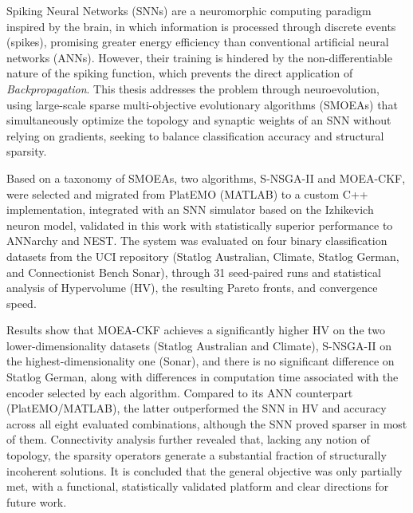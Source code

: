 \documentclass[dosguias,openany]{tesisusach}
\begin{document}
	\begin{resumenEn}
		Spiking Neural Networks (SNNs) are a neuromorphic computing paradigm inspired by the brain, in which information is processed through discrete events (spikes), promising greater energy efficiency than conventional artificial neural networks (ANNs). However, their training is hindered by the non-differentiable nature of the spiking function, which prevents the direct application of \textit{Backpropagation}. This thesis addresses the problem through neuroevolution, using large-scale sparse multi-objective evolutionary algorithms (SMOEAs) that simultaneously optimize the topology and synaptic weights of an SNN without relying on gradients, seeking to balance classification accuracy and structural sparsity.

		Based on a taxonomy of SMOEAs, two algorithms, S-NSGA-II and MOEA-CKF, were selected and migrated from PlatEMO (MATLAB) to a custom C++ implementation, integrated with an SNN simulator based on the Izhikevich neuron model, validated in this work with statistically superior performance to ANNarchy and NEST. The system was evaluated on four binary classification datasets from the UCI repository (Statlog Australian, Climate, Statlog German, and Connectionist Bench Sonar), through 31 seed-paired runs and statistical analysis of Hypervolume (HV), the resulting Pareto fronts, and convergence speed.

		Results show that MOEA-CKF achieves a significantly higher HV on the two lower-dimensionality datasets (Statlog Australian and Climate), S-NSGA-II on the highest-dimensionality one (Sonar), and there is no significant difference on Statlog German, along with differences in computation time associated with the encoder selected by each algorithm. Compared to its ANN counterpart (PlatEMO/MATLAB), the latter outperformed the SNN in HV and accuracy across all eight evaluated combinations, although the SNN proved sparser in most of them. Connectivity analysis further revealed that, lacking any notion of topology, the sparsity operators generate a substantial fraction of structurally incoherent solutions. It is concluded that the general objective was only partially met, with a functional, statistically validated platform and clear directions for future work.
	\end{resumenEn}

	
\end{document}
